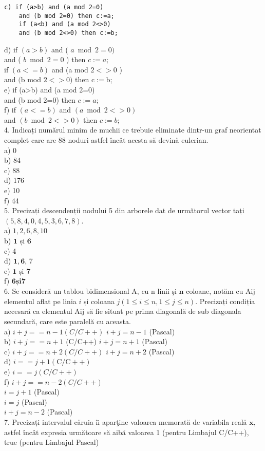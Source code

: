 \begin{verbatim}
c) if (a>b) and (a mod 2=0)
    and (b mod 2=0) then c:=a;
    if (a<b) and (a mod 2<>0)
    and (b mod 2<>0) then c:=b;
\end{verbatim}

d) if $(a>b)$ and ( $a \bmod 2=0)$\\
and ( $b \bmod 2=0$ ) then $c:=a$;\\
if $(a<=b)$ and (a mod $2<>0$ )\\
and $(\mathrm{b}$ mod $2<>0)$ then $\mathrm{c}:=\mathrm{b}$;\\
e) if (a>b) and (a mod 2=0)\\
and (b mod 2=0) then $c:=a ;$\\
f) if $(a<=b)$ and $(a \bmod 2<>0)$\\
and $(b \bmod 2<>0)$ then $c:=b$;\\
4. Indicați numărul minim de muchii ce trebuie eliminate dintr-un graf neorientat complet care are 88 noduri astfel încât acesta să devină eulerian.\\
a) 0\\
b) 84\\
c) 88\\
d) 176\\
e) 10\\
f) 44\\
5. Precizați descendenții nodului 5 din arborele dat de următorul vector tați $(5,8,4,0,4,5,3,6,7,8)$.\\
a) $1,2,6,8,10$\\
b) $\mathbf{1}$ și $\mathbf{6}$\\
c) 4\\
d) $\mathbf{1 , 6}$, 7\\
e) $\mathbf{1}$ și $\mathbf{7}$\\
f) $\mathbf{6 s ̦ i} \mathbf{7}$\\
6. Se consideră un tablou bidimensional A, cu n linii şi $\mathbf{n}$ coloane, notăm cu Aij elementul aflat pe linia $i$ și coloana $j(1 \leq i \leq n, 1 \leq j \leq n)$. Precizați condiția necesară ca elementul Aij să fie situat pe prima diagonală de sub diagonala secundară, care este paralelă cu aceasta.\\
a) $i+j==n-1(C / C++)$ $i+j=n-1$ (Pascal)\\
b) $i+j==n+1$ (C/C++) $i+j=n+1$ (Pascal)\\
c) $i+j==n+2(C / C++)$ $i+j=n+2$ (Pascal)\\
d) $i==j+1(\mathrm{C} / \mathrm{C}++)$\\
e) $i==j(C / C++)$\\
f) $i+j==n-2(C / C++)$\\
$i=j+1$ (Pascal)\\
$i=j$ (Pascal)\\
$i+j=n-2$ (Pascal)\\
7. Precizați intervalul căruia îi aparţine valoarea memorată de variabila reală $\mathbf{x}$, astfel încât expresia următoare să aibă valoarea 1 (pentru Limbajul C/C++), true (pentru Limbajul Pascal)

